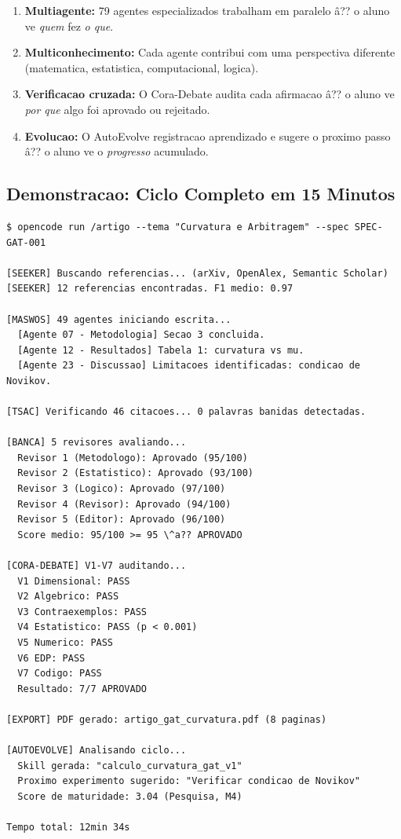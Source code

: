 \begin{enumerate}[nosep]
 \item \textbf{Multiagente:} 79 agentes especializados trabalham em
 paralelo \^a?? o aluno ve \textit{quem} fez \textit{o que}.
 \item \textbf{Multiconhecimento:} Cada agente contribui com uma
 perspectiva diferente (matematica, estatistica, computacional,
 logica).
 \item \textbf{Verificacao cruzada:} O Cora-Debate audita cada
 afirmacao \^a?? o aluno ve \textit{por que} algo foi aprovado
 ou rejeitado.
 \item \textbf{Evolucao:} O AutoEvolve registracao aprendizado e
 sugere o proximo passo \^a?? o aluno ve o \textit{progresso}
 acumulado.
\end{enumerate}

\subsection{Demonstracao: Ciclo Completo em 15 Minutos}

\begin{lstlisting}[caption={Ciclo completo de evolucao \^a?? saida do terminal}, label=lst:ciclo]
$ opencode run /artigo --tema "Curvatura e Arbitragem" --spec SPEC-GAT-001

[SEEKER] Buscando referencias... (arXiv, OpenAlex, Semantic Scholar)
[SEEKER] 12 referencias encontradas. F1 medio: 0.97

[MASWOS] 49 agentes iniciando escrita...
  [Agente 07 - Metodologia] Secao 3 concluida.
  [Agente 12 - Resultados] Tabela 1: curvatura vs mu.
  [Agente 23 - Discussao] Limitacoes identificadas: condicao de Novikov.

[TSAC] Verificando 46 citacoes... 0 palavras banidas detectadas.

[BANCA] 5 revisores avaliando...
  Revisor 1 (Metodologo): Aprovado (95/100)
  Revisor 2 (Estatistico): Aprovado (93/100)
  Revisor 3 (Logico): Aprovado (97/100)
  Revisor 4 (Revisor): Aprovado (94/100)
  Revisor 5 (Editor): Aprovado (96/100)
  Score medio: 95/100 >= 95 \^a?? APROVADO

[CORA-DEBATE] V1-V7 auditando...
  V1 Dimensional: PASS
  V2 Algebrico: PASS
  V3 Contraexemplos: PASS
  V4 Estatistico: PASS (p < 0.001)
  V5 Numerico: PASS
  V6 EDP: PASS
  V7 Codigo: PASS
  Resultado: 7/7 APROVADO

[EXPORT] PDF gerado: artigo_gat_curvatura.pdf (8 paginas)

[AUTOEVOLVE] Analisando ciclo...
  Skill gerada: "calculo_curvatura_gat_v1"
  Proximo experimento sugerido: "Verificar condicao de Novikov"
  Score de maturidade: 3.04 (Pesquisa, M4)

Tempo total: 12min 34s
\end{lstlisting}

